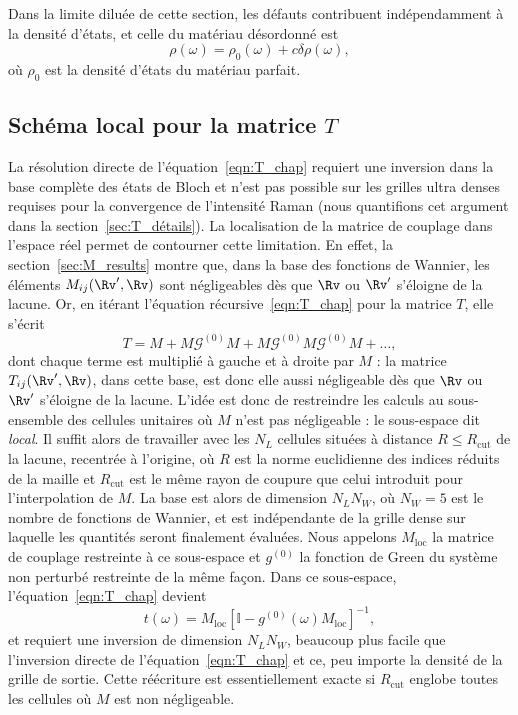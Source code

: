 Dans la limite diluée de cette section, les défauts contribuent indépendamment à la densité d'états, et celle du matériau désordonné est
\begin{equation}
    \rho(\omega) = \rho_0(\omega) + c\delta\rho(\omega),
\end{equation}
où $\rho_0$ est la densité d'états du matériau parfait.

\subsection{Schéma local pour la matrice $T$}\label{sec:T_local}

La résolution directe de l'équation~\eqref{eqn:T_chap} requiert une inversion dans la base complète des états de Bloch et n'est pas possible sur les grilles ultra denses requises pour la convergence de l'intensité Raman (nous quantifions cet argument dans la section~\ref{sec:T_détails}). La localisation de la matrice de couplage dans l'espace réel permet de contourner cette limitation. En effet, la section~\ref{sec:M_results} montre que, dans la base des fonctions de Wannier, les éléments $M_{ij}(\Rv',\Rv)$ sont négligeables dès que $\Rv$ ou $\Rv'$ s'éloigne de la lacune. Or, en itérant l'équation récursive~\eqref{eqn:T_chap} pour la matrice $T$, elle s'écrit
\begin{equation}
    T = M+ M\mathcal{G}^{(0)}M+M\mathcal{G}^{(0)}M\mathcal{G}^{(0)}M+\dots,
\end{equation}
dont chaque terme est multiplié à gauche et à droite par $M$ : la matrice $T_{ij}(\Rv',\Rv)$, dans cette base, est donc elle aussi négligeable dès que $\Rv$ ou $\Rv'$ s'éloigne de la lacune. L'idée est donc de restreindre les calculs au sous-ensemble des cellules unitaires où $M$ n'est pas négligeable : le sous-espace dit \textit{local}. Il suffit alors de travailler avec les $N_L$ cellules situées à distance $R\le R_\text{cut}$ de la lacune, recentrée à l'origine, où $R$ est la norme euclidienne des indices réduits de la maille et $R_\text{cut}$ est le même rayon de coupure que celui introduit pour l'interpolation de $M$. La base est alors de dimension $N_LN_W$, où $N_W=5$ est le nombre de fonctions de Wannier, et est indépendante de la grille dense sur laquelle les quantités seront finalement évaluées. Nous appelons $M_\text{loc}$ la matrice de couplage restreinte à ce sous-espace et $g^{(0)}$ la fonction de Green du système non perturbé restreinte de la même façon. Dans ce sous-espace, l'équation~\eqref{eqn:T_chap} devient
\begin{equation}
    t(\omega) = M_\text{loc}\left[\mathbb{I}-g^{(0)}(\omega)M_\text{loc}\right]^{-1},\label{eqn:t_loc}
\end{equation}
et requiert une inversion de dimension $N_LN_W$, beaucoup plus facile que l'inversion directe de l'équation~\eqref{eqn:T_chap} et ce, peu importe la densité de la grille de sortie. Cette réécriture est essentiellement exacte si $R_\text{cut}$ englobe toutes les cellules où $M$ est non négligeable.

